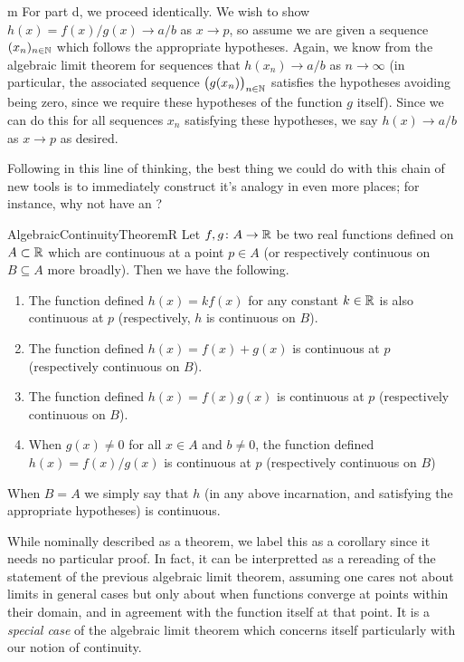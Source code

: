 \documentclass[11pt]{article}
\begin{document}
\begin{my proof}{m}
For part d, we proceed identically. We wish to show $h(x) = f(x) / g(x) \to a/b$ as $x \to p$, so assume we are given a sequence $(x_n)_{n\in \mathbb{N}}$ which follows the appropriate hypotheses. Again, we know from the algebraic limit theorem for sequences that $h(x_n) \to a/b$ as $n\to \infty$ (in particular, the associated sequence $\big( g(x_n) \big)_{n\in \mathbb{N}}$ satisfies the hypotheses avoiding being zero, since we require these hypotheses of the function $g$ itself). Since we can do this for all sequences $x_n$ satisfying these hypotheses, we say $h(x) \to a/b$ as $x \to p$ as desired. 
\end{my proof}

Following in this line of thinking, the best thing we could do with this chain of new tools is to immediately construct it's analogy in even more places; for instance, why not have an ?

\begin{label corollary}{AlgebraicContinuityTheoremR}
Let $f,g\colon A \to \mathbb{R}$ be two real functions defined on $A \subset \mathbb{R}$ which are continuous at a point $p \in A$ (or respectively continuous on $B \subseteq A$ more broadly). Then we have the following. \begin{enumerate}
\item The function defined $h(x) = k f(x)$ for any constant $k \in \mathbb{R}$ is also continuous at $p$ (respectively, $h$ is continuous on $B$).
\item The function defined $h(x) = f(x) + g(x)$ is continuous at $p$ (respectively continuous on $B$).
\item The function defined $h(x) = f(x) g(x)$ is continuous at $p$ (respectively continuous on $B$).
\item When $g(x) \neq 0$ for all $x \in A$ and $b \neq 0$, the function defined $h(x) = f(x) / g(x)$ is continuous at $p$ (respectively continuous on $B$)
\end{enumerate}
When $B = A$ we simply say that $h$ (in any above incarnation, and satisfying the appropriate hypotheses) is continuous.
\end{label corollary}

While nominally described as a theorem, we label this as a corollary since it needs no particular proof. In fact, it can be interpretted as a rereading of the statement of the previous algebraic limit theorem, assuming one cares not about limits in general cases but only about when functions converge at points within their domain, and in agreement with the function itself at that point. It is a \emph{special case} of the algebraic limit theorem which concerns itself particularly with our notion of continuity.
\end{document}
